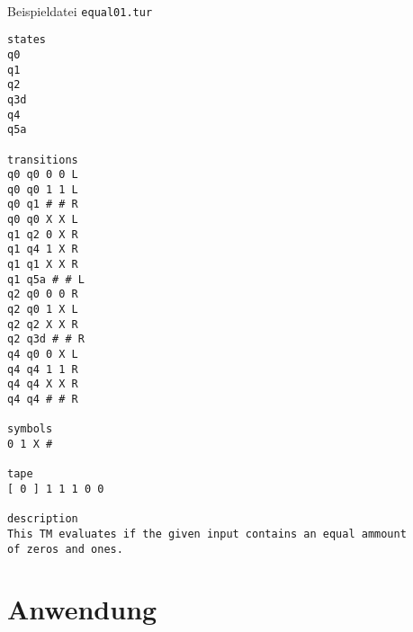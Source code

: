 \documentclass[10pt, a4paper]{article}
\begin{document}
\paragraph*{}
\begin{center}
Beispieldatei \texttt{equal01.tur}
\end{center}
\begin{tiny}
\begin{tcolorbox}
\begin{verbatim}
states
q0
q1
q2
q3d
q4
q5a

transitions
q0 q0 0 0 L
q0 q0 1 1 L
q0 q1 # # R
q0 q0 X X L
q1 q2 0 X R
q1 q4 1 X R
q1 q1 X X R
q1 q5a # # L
q2 q0 0 0 R
q2 q0 1 X L
q2 q2 X X R
q2 q3d # # R
q4 q0 0 X L
q4 q4 1 1 R
q4 q4 X X R
q4 q4 # # R

symbols
0 1 X #

tape
[ 0 ] 1 1 1 0 0

description
This TM evaluates if the given input contains an equal ammount
of zeros and ones. 
\end{verbatim}
\end{tcolorbox}
\end{tiny}
\section*{Anwendung}
\end{document}
